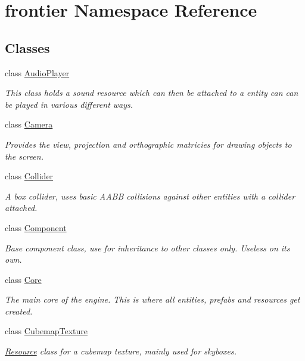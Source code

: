 \hypertarget{namespacefrontier}{}\section{frontier Namespace Reference}
\label{namespacefrontier}
\subsection*{Classes}
\begin{DoxyCompactItemize}
\item 
class \hyperlink{classfrontier_1_1_audio_player}{Audio\+Player}
\begin{DoxyCompactList}\small\item\em This class holds a sound resource which can then be attached to a entity can can be played in various different ways. \end{DoxyCompactList}\item 
class \hyperlink{classfrontier_1_1_camera}{Camera}
\begin{DoxyCompactList}\small\item\em Provides the view, projection and orthographic matricies for drawing objects to the screen. \end{DoxyCompactList}\item 
class \hyperlink{classfrontier_1_1_collider}{Collider}
\begin{DoxyCompactList}\small\item\em A box collider, uses basic A\+A\+BB collisions against other entities with a collider attached. \end{DoxyCompactList}\item 
class \hyperlink{classfrontier_1_1_component}{Component}
\begin{DoxyCompactList}\small\item\em Base component class, use for inheritance to other classes only. Useless on its own. \end{DoxyCompactList}\item 
class \hyperlink{classfrontier_1_1_core}{Core}
\begin{DoxyCompactList}\small\item\em The main core of the engine. This is where all entities, prefabs and resources get created. \end{DoxyCompactList}\item 
class \hyperlink{classfrontier_1_1_cubemap_texture}{Cubemap\+Texture}
\begin{DoxyCompactList}\small\item\em \hyperlink{classfrontier_1_1_resource}{Resource} class for a cubemap texture, mainly used for skyboxes. \end{DoxyCompactList}\item 

\end{DoxyCompactItemize}
